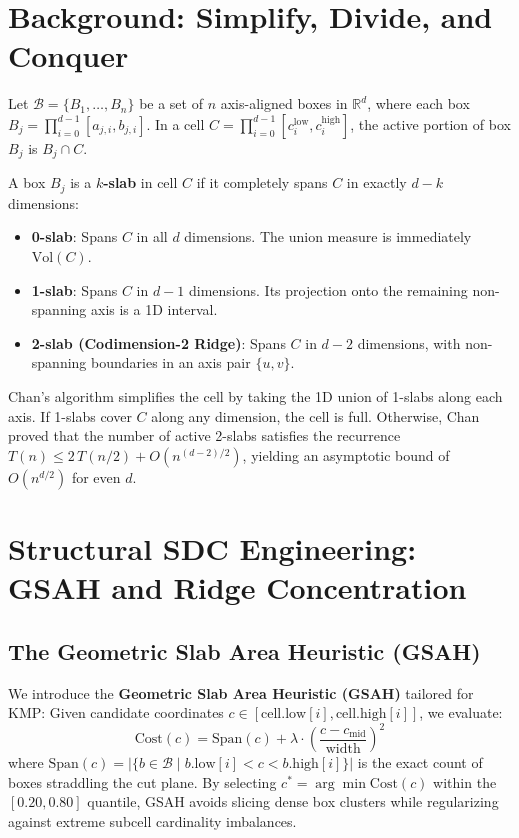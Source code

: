 \documentclass[11pt,a4paper]{article}
\theoremstyle{plain}
\theoremstyle{definition}
\begin{document}
\section{Background: Simplify, Divide, and Conquer}

Let $\mathcal{B} = \{B_1, \dots, B_n\}$ be a set of $n$ axis-aligned boxes in $\mathbb{R}^d$, where each box $B_j = \prod_{i=0}^{d-1} [a_{j, i}, b_{j, i}]$. In a cell $C = \prod_{i=0}^{d-1} [c_{i}^{\text{low}}, c_{i}^{\text{high}}]$, the active portion of box $B_j$ is $B_j \cap C$.

A box $B_j$ is a \textbf{$k$-slab} in cell $C$ if it completely spans $C$ in exactly $d - k$ dimensions:
\begin{itemize}
    \item \textbf{0-slab}: Spans $C$ in all $d$ dimensions. The union measure is immediately $\mathrm{Vol}(C)$.
    \item \textbf{1-slab}: Spans $C$ in $d-1$ dimensions. Its projection onto the remaining non-spanning axis is a 1D interval.
    \item \textbf{2-slab (Codimension-2 Ridge)}: Spans $C$ in $d-2$ dimensions, with non-spanning boundaries in an axis pair $\{u, v\}$.
\end{itemize}

Chan's algorithm simplifies the cell by taking the 1D union of 1-slabs along each axis. If 1-slabs cover $C$ along any dimension, the cell is full. Otherwise, Chan proved that the number of active 2-slabs satisfies the recurrence $T(n) \le 2\, T(n/2) + O(n^{(d-2)/2})$, yielding an asymptotic bound of $O(n^{d/2})$ for even $d$.

\section{Structural SDC Engineering: GSAH and Ridge Concentration}

\subsection{The Geometric Slab Area Heuristic (GSAH)}
We introduce the \textbf{Geometric Slab Area Heuristic (GSAH)} tailored for KMP:
Given candidate coordinates $c \in [\text{cell}.\text{low}[i], \text{cell}.\text{high}[i]]$, we evaluate:
\begin{equation}
\mathrm{Cost}(c) = \mathrm{Span}(c) + \lambda \cdot \left(\frac{c - c_{\text{mid}}}{\text{width}}\right)^2
\end{equation}
where $\mathrm{Span}(c) = |\{b \in \mathcal{B} \mid b.\text{low}[i] < c < b.\text{high}[i]\}|$ is the exact count of boxes straddling the cut plane. By selecting $c^* = \arg\min \mathrm{Cost}(c)$ within the $[0.20, 0.80]$ quantile, GSAH avoids slicing dense box clusters while regularizing against extreme subcell cardinality imbalances.
\end{document}
